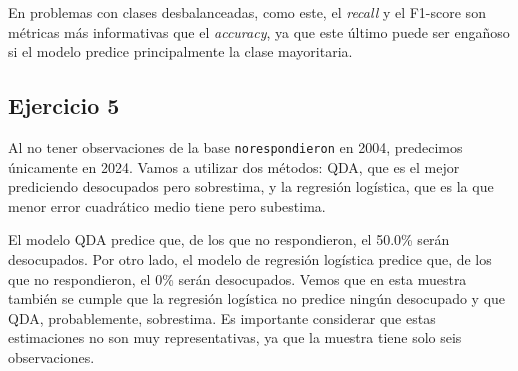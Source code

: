 \documentclass[11pt,a4paper]{article}
\begin{document}
En problemas con clases desbalanceadas, como este, el \textit{recall} y el F1-score son
métricas más informativas que el \textit{accuracy}, ya que este último puede ser engañoso si
el modelo predice principalmente la clase mayoritaria.

\subsection*{Ejercicio 5}

Al no tener observaciones de la base \texttt{norespondieron} en 2004, predecimos únicamente en
2024. Vamos a utilizar dos métodos: QDA, que es el mejor prediciendo desocupados pero
sobrestima, y la regresión logística, que es la que menor error cuadrático medio tiene pero
subestima.

El modelo QDA predice que, de los que no respondieron, el 50.0\% serán desocupados. Por otro
lado, el modelo de regresión logística predice que, de los que no respondieron, el 0\% serán
desocupados. Vemos que en esta muestra también se cumple que la regresión logística no predice
ningún desocupado y que QDA, probablemente, sobrestima. Es importante considerar que estas
estimaciones no son muy representativas, ya que la muestra tiene solo seis observaciones.
\end{document}
